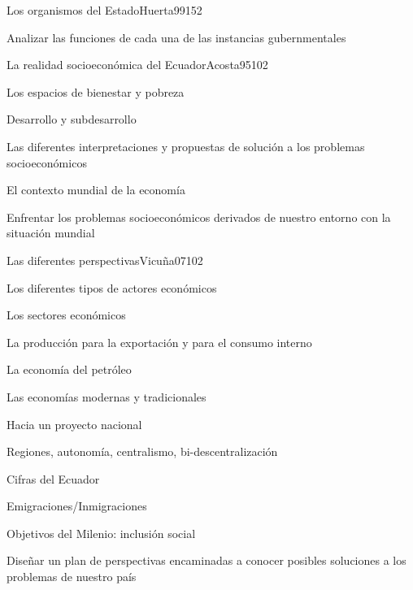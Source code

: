 \begin{syllabus}
\begin{unit}{Los organismos del Estado}{Huerta99}{15}{2}
   \begin{unitgoals}
      \item Analizar las funciones de cada una de las instancias gubernmentales
   \end{unitgoals}
\end{unit}

\begin{unit}{La realidad socioeconómica del Ecuador}{Acosta95}{10}{2}
   \begin{topics}
      \item Los espacios de bienestar y pobreza
	\item Desarrollo y subdesarrollo
	\item Las diferentes interpretaciones y propuestas de solución a los problemas socioeconómicos
	\item El contexto mundial de la economía
   \end{topics}

   \begin{unitgoals}
      \item Enfrentar los problemas socioeconómicos derivados de nuestro entorno con la situación mundial
   \end{unitgoals}
\end{unit}

\begin{unit}{Las diferentes perspectivas}{Vicuña07}{10}{2}
   \begin{topics}
      \item Los diferentes tipos de actores económicos
	\item Los sectores económicos
	\item La producción para la exportación y para el consumo interno
	\item La economía del petróleo
	\item Las economías modernas y tradicionales
	\item Hacia un proyecto nacional
	\item Regiones, autonomía, centralismo, bi-descentralización
	\item Cifras del Ecuador
	\item Emigraciones/Inmigraciones
	\item Objetivos del Milenio: inclusión social 
   \end{topics}

   \begin{unitgoals}
      \item Diseñar un plan de perspectivas encaminadas a conocer posibles soluciones a los problemas de nuestro país
   \end{unitgoals}
\end{unit}

\begin{coursebibliography}
\end{coursebibliography}
\end{syllabus}
